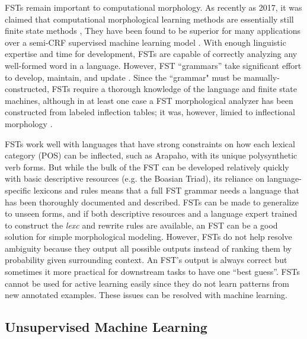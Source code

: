 \documentclass[12pt]{article}
\begin{document}
FSTs remain important to computational morphology. As recently as 2017, it was claimed that computational morphological learning methods are essentially still finite state methods \cite{goldsmith_computational_2017}, They have been found to be superior for many applications over a semi-CRF supervised machine learning model \cite{cotterell_labeled_2015}. With enough linguistic expertise and time for development, FSTs are capable of correctly analyzing any well-formed word in a language. However, FST “grammars” take significant effort to develop, maintain, and update \cite{durrett_supervised_2013,moeller_neural_2018}. Since the ``grammar" must be manually-constructed, FSTs require a thorough knowledge of the language and finite state machines, although in at least one case a FST morphological analyzer has been constructed from labeled inflection tables; it was, however, limied to inflectional morphology \cite{forsberg_learning_2016}.

FSTs work well with languages that have strong constraints on how each lexical category (POS) can be inflected, such as Arapaho, with its unique polysynthetic verb forms. But while the bulk of the FST can be developed relatively quickly with basic descriptive resources (e.g. the Boasian Triad), its reliance on language-specific lexicons and rules means that a full FST grammar needs a language that has been thoroughly documented and described. FSTs can be made to generalize to unseen forms, and if both descriptive resources and a language expert trained to construct the \textit{lexc} and rewrite rules are available, an FST can be a good solution for simple morphological modeling. However, FSTs do not help resolve ambiguity because they output all possible outputs instead of ranking them by probability given surrounding context. An FST's output is always correct but sometimes it more practical for downstream tasks to have one ``best guess''. FSTs cannot be used for active learning easily since they do not learn patterns from new annotated examples. These issues can be resolved with machine learning.

\subsection{Unsupervised Machine Learning}
\end{document}
